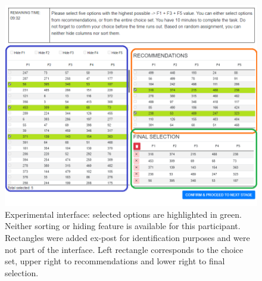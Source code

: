 \documentclass[a4paper,12pt]{article}
\begin{document}
\begin{figure}
\begin{center}    \includegraphics[width=0.99\linewidth]{staticFiles/EDITEDexperimentScreenFULL.png}
    \caption[Experimental interface]{Experimental interface: selected options are highlighted in green. Neither sorting or hiding feature is available for this participant. Rectangles were added ex-post for identification purposes and were not part of the interface. Left rectangle corresponds to the choice set, upper right to recommendations and lower right to final selection.}
    \label{fig:experimentInterface}
\end{center}
\end{figure}
\end{document}
